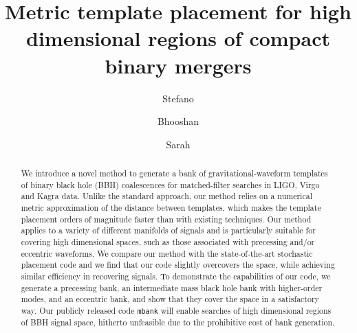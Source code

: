 \documentclass[twocolumn,showpacs,preprintnumbers,nofootinbib,prd,
superscriptaddress,10pt]{revtex4-2}
\begin{document}
\begin{abstract}
	We introduce a novel method to generate a bank of gravitational-waveform templates of binary black hole (BBH) coalescences for matched-filter searches in LIGO, Virgo and Kagra data. Unlike the standard approach, our method relies on a numerical metric approximation of the distance between templates, which makes the template placement orders of magnitude faster than with existing techniques.
	Our method applies to a variety of different manifolds of signals and is particularly suitable for covering high dimensional spaces, such as those associated with precessing and/or eccentric waveforms.
	We compare our method with the state-of-the-art stochastic placement code and we find that our code slightly overcovers the space, while achieving similar efficiency in recovering signals. To demonstrate the capabilities of our code, we generate a precessing bank, an intermediate mass black hole bank with higher-order modes, and an eccentric bank, and show that they cover the space in a satisfactory way.
	Our publicly released code \texttt{mbank} will enable searches of high dimensional regions of BBH signal space, hitherto unfeasible due to the prohibitive cost of bank generation.
\end{abstract}
	
	\title{Metric template placement for high dimensional regions of compact binary mergers}
	\author{Stefano }

	\author{Bhooshan }
        
	\author{Sarah }
	\maketitle

\end{document}
